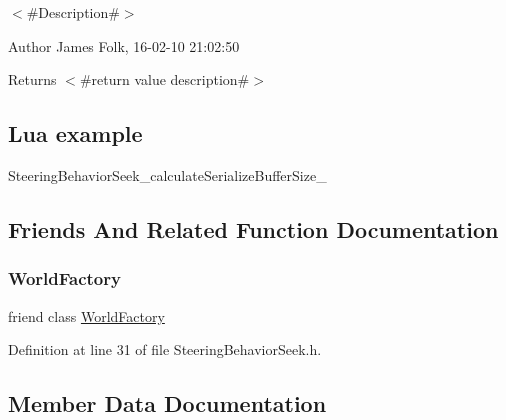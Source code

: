 $<$\#\+Description\#$>$ 

\begin{DoxyAuthor}{Author}
James Folk, 16-\/02-\/10 21\+:02\+:50
\end{DoxyAuthor}
\begin{DoxyReturn}{Returns}
$<$\#return value description\#$>$
\end{DoxyReturn}
\hypertarget{classnjli_1_1_steering_behavior_wander_ex1}{}\subsection{Lua example}\label{classnjli_1_1_steering_behavior_wander_ex1}

\begin{DoxyCodeInclude}
\end{DoxyCodeInclude}
Steering\+Behavior\+Seek\+\_\+calculate\+Serialize\+Buffer\+Size\+\_\+ 

\subsection{Friends And Related Function Documentation}
\mbox{\label{classnjli_1_1_steering_behavior_seek_acb96ebb09abe8f2a37a915a842babfac}} 
\subsubsection{\texorpdfstring{World\+Factory}{WorldFactory}}
{\footnotesize\ttfamily friend class \mbox{\hyperlink{classnjli_1_1_world_factory}{World\+Factory}}\hspace{0.3cm}{\ttfamily [friend]}}



Definition at line 31 of file Steering\+Behavior\+Seek.\+h.



\subsection{Member Data Documentation}
\mbox{\label{classnjli_1_1_steering_behavior_seek_a0c7b5158b2734da4d1e529c26a465eba}} 
